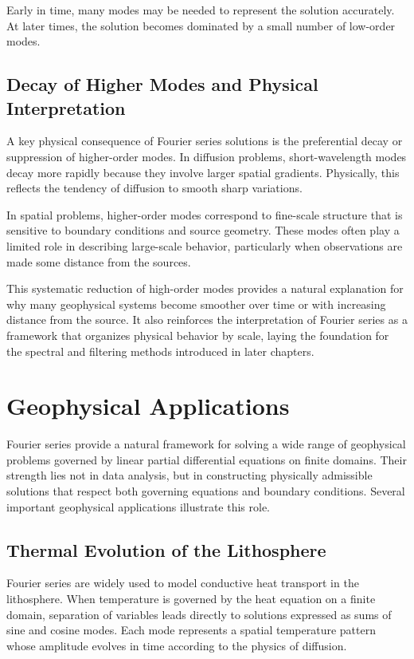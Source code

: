 Early in time, many modes may be needed to represent the solution accurately. At later times, the solution becomes dominated by a small number of low-order modes.

\subsection{Decay of Higher Modes and Physical Interpretation}

A key physical consequence of Fourier series solutions is the preferential decay or suppression of higher-order modes. In diffusion problems, short-wavelength modes decay more rapidly because they involve larger spatial gradients. Physically, this reflects the tendency of diffusion to smooth sharp variations.

In spatial problems, higher-order modes correspond to fine-scale structure that is sensitive to boundary conditions and source geometry. These modes often play a limited role in describing large-scale behavior, particularly when observations are made some distance from the sources.

This systematic reduction of high-order modes provides a natural explanation for why many geophysical systems become smoother over time or with increasing distance from the source. It also reinforces the interpretation of Fourier series as a framework that organizes physical behavior by scale, laying the foundation for the spectral and filtering methods introduced in later chapters.


\section{Geophysical Applications}

Fourier series provide a natural framework for solving a wide range of geophysical problems governed by linear partial differential equations on finite domains. Their strength lies not in data analysis, but in constructing physically admissible solutions that respect both governing equations and boundary conditions. Several important geophysical applications illustrate this role.

\subsection{Thermal Evolution of the Lithosphere}

Fourier series are widely used to model conductive heat transport in the lithosphere. When temperature is governed by the heat equation on a finite domain, separation of variables leads directly to solutions expressed as sums of sine and cosine modes. Each mode represents a spatial temperature pattern whose amplitude evolves in time according to the physics of diffusion.

